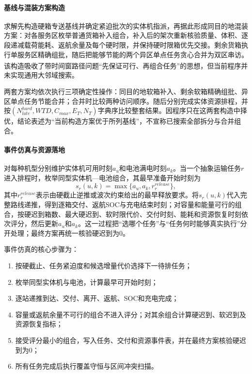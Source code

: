 \paragraph{基线与混装方案构造}
求解先构造硬箱专送基线并确定紧迫批次的实体机指派，再据此形成同目的地混装方案：对各服务区枚举普通货箱补入组合，补入后的架次重新核验质量、体积、逐段递减载荷能耗、返航余量及每个硬时限，并保持硬时限箱优先交接。剩余货箱执行单服务区精确组批，随后把能够节能的两个异区单点任务贪心合并为双区串访。该构造吸收了带时间窗路径问题“先保证可行、再组合任务”的思想\textsuperscript{\cite{Ropke2006}}，但当前程序并未实现通用大邻域搜索。

两套方案均依次执行三项确定性操作：同目的地软箱补入、剩余软箱精确组批、异区单点任务节能合并；合并时比较两种访问顺序。随后分别完成实体资源排程，并按$(N_{late}^{hard},WTD,C_{max},E_T,N_T)$字典序比较整套结果。因程序只在这两套构造中择优，结论表述为“当前构造方案优于所列基线”，不宣称已搜索全部拆分与合并组合。

\paragraph{事件仿真与资源落地}
对每种机型分别维护实体机可用时刻$a_u$和电池满电时刻$a_k$。当一个抽象运输任务$r$进入排程时，枚举同型实体机—电池组合，其最早准备开始时刻为
\begin{equation}
s_r(u,k)=\max\{a_u,a_k,r_r^{release}\},
\end{equation}
其中$r_r^{release}$表示由硬截止逆推或波次约束给出的最早释放要求。将$s_r(u,k)$代入完整路线递推，得到逐箱交付、返航SOC与充电结束时刻；对容量和能量可行的组合，按硬迟到箱数、最大硬迟到、软时限代价、交付时刻、能耗和资源恢复时刻依次评分，然后更新$a_u$和$a_k$。这一过程把“选哪个任务”与“任务何时能够真实执行”分开处理；最终方案再统一核验硬迟到为0。

事件仿真的核心步骤为：
\begin{enumerate}
  \item 按硬截止、任务紧迫度和候选增量代价选择下一待排任务；
  \item 枚举同型实体机与电池，计算最早可开始时刻；
  \item 逐站递推到达、交付、离开、返航、SOC和充电完成；
  \item 容量或返航余量不可行的组合不进入评分；对其余组合计算硬迟到、软迟到及资源恢复指标；
  \item 接受评分最小的组合，写入任务、交付和资源事件表，并在最终方案核验硬迟到为0；
  \item 所有任务完成后执行覆盖守恒与区间冲突扫描。
\end{enumerate}

